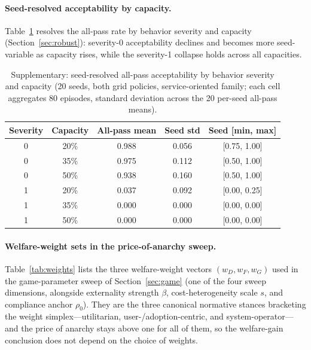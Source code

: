 \documentclass[12pt]{article}
\begin{document}
\paragraph{Seed-resolved acceptability by capacity.} Table~\ref{tab:seedcap} resolves the all-pass rate by behavior severity and capacity (Section~\ref{sec:robust}): severity-0 acceptability declines and becomes more seed-variable as capacity rises, while the severity-1 collapse holds across all capacities.

\begin{table}[H]
\centering
\caption{Supplementary: seed-resolved all-pass acceptability by behavior severity and capacity (20 seeds, both grid policies, service-oriented family; each cell aggregates 80 episodes, standard deviation across the 20 per-seed all-pass means).}
\label{tab:seedcap}
\begin{tabular}{ccccc}
\hline
Severity & Capacity & All-pass mean & Seed std & Seed [min, max] \\
\hline
0 & 20\% & 0.988 & 0.056 & [0.75, 1.00] \\
0 & 35\% & 0.975 & 0.112 & [0.50, 1.00] \\
0 & 50\% & 0.938 & 0.160 & [0.50, 1.00] \\
1 & 20\% & 0.037 & 0.092 & [0.00, 0.25] \\
1 & 35\% & 0.000 & 0.000 & [0.00, 0.00] \\
1 & 50\% & 0.000 & 0.000 & [0.00, 0.00] \\
\hline
\end{tabular}
\end{table}

\paragraph{Welfare-weight sets in the price-of-anarchy sweep.} Table~\ref{tab:weights} lists the three welfare-weight vectors $(w_D,w_F,w_G)$ used in the game-parameter sweep of Section~\ref{sec:game} (one of the four sweep dimensions, alongside externality strength $\beta$, cost-heterogeneity scale $s$, and compliance anchor $\rho_0$). They are the three canonical normative stances bracketing the weight simplex---utilitarian, user-/adoption-centric, and system-operator---and the price of anarchy stays above one for all of them, so the welfare-gain conclusion does not depend on the choice of weights.
\end{document}
